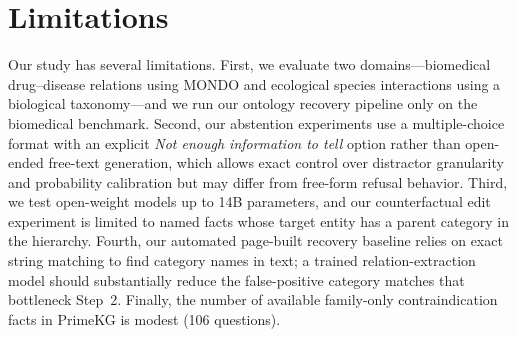 




\section{Limitations}

Our study has several limitations. First, we evaluate two domains—biomedical drug--disease relations using MONDO and ecological species interactions using a biological taxonomy—and we run our ontology recovery pipeline only on the biomedical benchmark. Second, our abstention experiments use a multiple-choice format with an explicit \emph{Not enough information to tell} option rather than open-ended free-text generation, which allows exact control over distractor granularity and probability calibration but may differ from free-form refusal behavior. Third, we test open-weight models up to 14B parameters, and our counterfactual edit experiment is limited to named facts whose target entity has a parent category in the hierarchy. Fourth, our automated page-built recovery baseline relies on exact string matching to find category names in text; a trained relation-extraction model should substantially reduce the false-positive category matches that bottleneck Step~2. Finally, the number of available family-only contraindication facts in PrimeKG is modest (106 questions).

